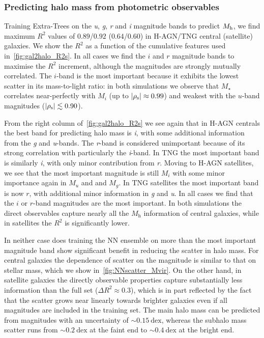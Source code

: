 \documentclass[usenatbib,useAMS]{mnras}
\begin{document}
\subsubsection{Predicting halo mass from photometric observables}

Training Extra-Trees on the \textit{u}, \textit{g}, \textit{r} and \textit{i} magnitude bands to predict $M_{\rm h}$, we find maximum $R^2$ values of $0.89$/$0.92$ ($0.64$/$0.60$) in H-AGN/TNG central (satellite) galaxies. We show the $R^2$ as a function of the cumulative features used in~\cref{fig:gal2halo_R2s}. In all cases we find the $i$ and $r$ magnitude bands to maximise the $R^2$ increment, although the magnitudes are strongly mutually correlated. The $i$-band is the most important because it exhibits the lowest scatter in its mass-to-light ratio: in both simulations we observe that $M_\star$ correlates near-perfectly with $M_i$ (up to $\left|\rho_{\rm s}\right| \approx 0.99$) and weakest with the $u$-band magnitudes ($\left|\rho_{\rm s}\right| \lesssim 0.90$).

From the right column of~\cref{fig:gal2halo_R2s} we see again that in H-AGN centrals the best band for predicting halo mass is \textit{i}, with some additional information from the \textit{g} and \textit{u}-bands. The \textit{r}-band is considered unimportant because of its strong correlation with particularly the \textit{i}-band. In TNG the most important band is similarly \textit{i}, with only minor contribution from \textit{r}. Moving to H-AGN satellites, we see that the most important magnitude is still $M_i$ with some minor importance again in $M_u$ and  and $M_g$. In TNG satellites the most important band is now $r$, with additional minor information in \textit{g} and \textit{u}. In all cases we find that the $i$ or $r$-band magnitudes are the most important. In both simulations the direct observables capture nearly all the $M_\text{h}$ information of central galaxies, while in satellites the $R^2$ is significantly lower.

In neither case does training the \ac{NN} ensemble on more than the most important magnitude band show significant benefit in reducing the scatter in halo mass. For central galaxies the dependence of scatter on the magnitude is similar to that on stellar mass, which we show in~\cref{fig:NNscatter_Mvir}. On the other hand, in satellite galaxies the directly observable properties capture substantially less information than the full set ($\Delta R^2 \approx 0.3$), which is in part reflected by the fact that the scatter grows near linearly towards brighter galaxies even if all magnitudes are included in the training set. The main halo mass can be predicted from magnitudes with an uncertainty of $\sim0.15~\mathrm{dex}$, whereas the subhalo mass scatter runs from $\sim0.2~\mathrm{dex}$ at the faint end to $\sim0.4~\mathrm{dex}$ at the bright end.
\end{document}
